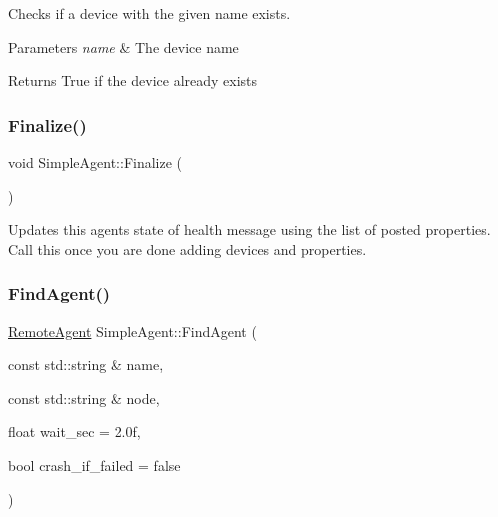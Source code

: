Checks if a device with the given name exists. 


\begin{DoxyParams}{Parameters}
{\em name} & The device name \\
\hline
\end{DoxyParams}
\begin{DoxyReturn}{Returns}
True if the device already exists 
\end{DoxyReturn}
\mbox{\label{classcubesat_1_1SimpleAgent_afe5e23b701690a39695449ee8a4c955a}} 
\subsubsection{\texorpdfstring{Finalize()}{Finalize()}}
{\footnotesize\ttfamily void Simple\+Agent\+::\+Finalize (\begin{DoxyParamCaption}{ }\end{DoxyParamCaption})}



Updates this agent\textquotesingle{}s state of health message using the list of posted properties. Call this once you are done adding devices and properties. 

\mbox{\label{classcubesat_1_1SimpleAgent_ad4f041659c7c8034b73e10bf19b0b194}} 
\subsubsection{\texorpdfstring{Find\+Agent()}{FindAgent()}\hspace{0.1cm}{\footnotesize\ttfamily [1/2]}}
{\footnotesize\ttfamily \hyperlink{classcubesat_1_1RemoteAgent}{Remote\+Agent} Simple\+Agent\+::\+Find\+Agent (\begin{DoxyParamCaption}\item[{const std\+::string \&}]{name,  }\item[{const std\+::string \&}]{node,  }\item[{float}]{wait\+\_\+sec = {\ttfamily 2.0f},  }\item[{bool}]{crash\+\_\+if\+\_\+failed = {\ttfamily false} }\end{DoxyParamCaption})}



